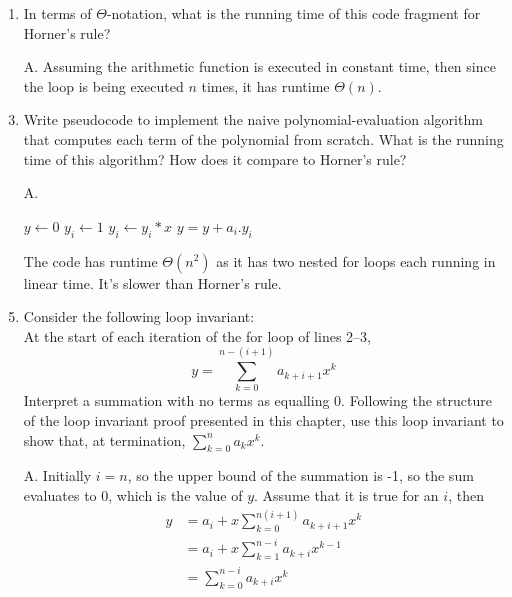 \documentclass[fontsize=12pt,paper=a4]{book}
\begin{document}
\begin{enumerate}
       \begin{enumerate}
        \item In terms of $\Theta$-notation, what is the running time of this code fragment for Horner’s rule?
        \item[A.]
              Assuming the arithmetic function is executed in constant time, then since the loop is being executed $n$ times, it has runtime $\Theta(n)$.
              
        \item Write pseudocode to implement the naive polynomial-evaluation algorithm that computes each term of the polynomial from scratch. What is the running time of this algorithm? How does it compare to Horner’s rule?
        \item[A.]
              \begin{algorithmic}
               \State $y \gets 0$
               \State $y_i \gets 1$
               \State $y_i \gets y_i * x$
               \EndFor
               \State $y = y + a_i . y_i$
               \EndFor
              \end{algorithmic}
              The code has runtime $\Theta(n^2)$ as it has two nested for loops each running in linear time. It’s slower than Horner’s rule.
              
        \item Consider the following loop invariant:\\
              At the start of each iteration of the for loop of lines 2–3,
              \begin{equation*}
               y = \sum_{k=0}^{n-(i+1)} a_{k+i+1} x^k
              \end{equation*}
              Interpret a summation with no terms as equalling 0. Following the structure of the loop invariant proof presented in this chapter, use this loop invariant to show that, at termination, $\sum_{k=0}^{n} a_k x^k$.
        \item[A.]
              Initially $i=n$, so the upper bound of the summation is -1, so the sum evaluates to 0, which is the value of $y$. Assume that it is true for an $i$, then
              \begin{equation*}
               \begin{split}
                y & = a_i + x \sum_{k=0}^{n (i+1)} a_{k+i+1} x^k \\
                & = a_i + x \sum_{k=1}^{n-i} a_{k+i} x^{k-1} \\
                & = \sum_{k=0}^{n-i} a_{k+i} x^{k}
               \end{split}
              \end{equation*}
              

\end{enumerate}
\end{enumerate}
\end{document}
